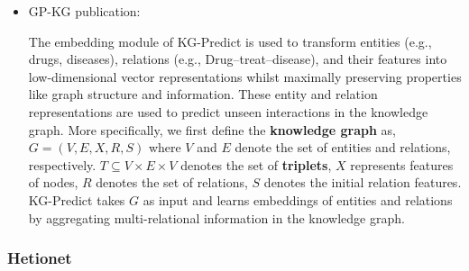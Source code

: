 \documentclass{article}
\begin{document}
\begin{itemize}

\item GP-KG publication:
\begin{displayquote}
The embedding module of KG-Predict is used to transform entities (e.g., drugs, diseases), relations (e.g., Drug–treat–disease), and their features into low-dimensional vector representations whilst maximally preserving properties like graph structure and information. These entity and relation representations are used to predict unseen interactions in the knowledge graph. More specifically, we first define the \textbf{knowledge graph} as, $ G = (V , E, X, R, S) $ where $ V $ and $ E $ denote the set of entities and relations, respectively. $ T \subseteq V \times E \times V $ denotes the set of \textbf{triplets}, $ X $ represents features of nodes, $ R $ denotes the set of relations, $ S $ denotes the initial relation features. KG-Predict takes $ G $ as input and learns embeddings of entities and relations by aggregating multi-relational information in the knowledge graph.
\end{displayquote}

\end{itemize}


\subsubsection{Hetionet}
\end{document}
